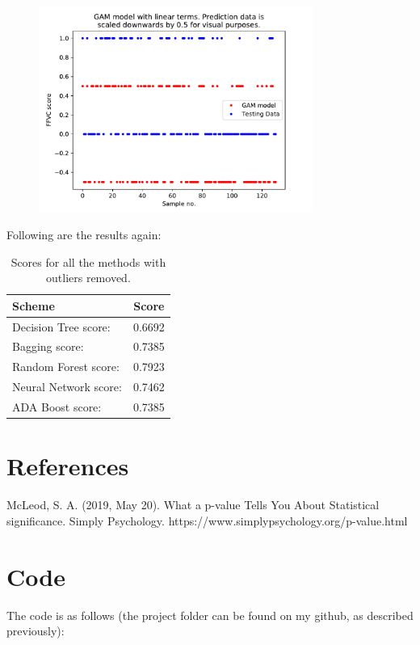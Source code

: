 \documentclass[]{article}
\begin{document}
\begin{figure}[H]
	\centering
	\includegraphics[width=0.8\textwidth]{figures/LASTTHREE.pdf}
	\label{fig:LASTTHREE}
\end{figure}

Following are the results again:

\begin{table}[H]
	\centering
	\caption{Scores for all the methods with outliers removed.}
	\begin{tabular}[t]{l@{\hskip 0.5in}c}
		\toprule
		Scheme & Score \\
		\midrule
		Decision Tree score:&	 0.6692\\
		Bagging score:  	& 0.7385\\
		Random Forest score:&	 0.7923\\
		Neural Network score:&	 0.7462\\
		ADA Boost score:	 &0.7385\\
		\bottomrule
	\end{tabular}
	\label{tab:LASTONE}
\end{table}




\section*{References}
McLeod, S. A. (2019, May 20). What a p-value Tells You About Statistical significance. Simply Psychology. https://www.simplypsychology.org/p-value.html


\section*{Code}
The code is as follows (the project folder can be found on my github, as described previously):
\end{document}
